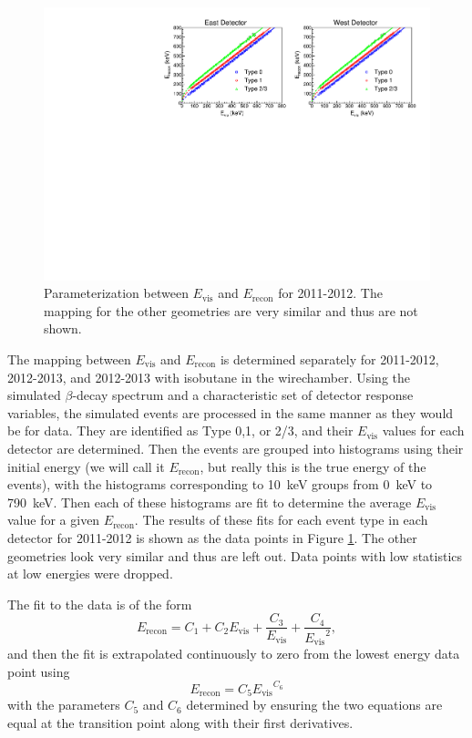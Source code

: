 \begin{figure}[h]
  \centering
  \includegraphics[scale=0.78]{3-UCNAAnalysis/2011-2012_Evis_to_Erecon.pdf}
  \caption{Parameterization between $E_{\mathrm{vis}}$ and $E_{\mathrm{recon}}$ for
    2011-2012. The mapping for the other geometries are very similar and thus are
    not shown.}
  \label{fig:Erecon}
\end{figure}

The mapping between $E_{\mathrm{vis}}$ and $E_{\mathrm{recon}}$ is determined separately
for 2011-2012, 2012-2013, and 2012-2013 with isobutane in the wirechamber.
Using the simulated $\beta$-decay spectrum and a characteristic set of detector
response variables, the simulated events are processed in the same manner as
they would be for data. They are identified as Type 0,1, or 2/3, and their
$E_{\mathrm{vis}}$ values for each detector are determined. Then the events are
grouped into histograms using their initial energy (we will call it $E_{\mathrm{recon}}$,
but really this is the true energy of the events), with the histograms corresponding
to 10~keV groups from 0~keV to 790~keV. Then each of these histograms are fit to
determine the average $E_{\mathrm{vis}}$ value for a given $E_{\mathrm{recon}}$. The results
of these fits for each event type in each detector for 2011-2012 is shown as the data
points in Figure \ref{fig:Erecon}. The other geometries look very similar and thus are
left out. Data points with low statistics at low energies were dropped.

The fit to the data is of the form
\begin{equation}
  E_{\mathrm{recon}} = C_1 + C_2E_{\mathrm{vis}} + \frac{C_3}{E_{\mathrm{vis}}} + \frac{C_4}{{E_{\mathrm{vis}}}^2},
\end{equation}
and then the fit is extrapolated continuously to zero from the lowest energy data point using
\begin{equation}
  E_{\mathrm{recon}} = C_5{E_{\mathrm{vis}}}^{C_6}
\end{equation}
with the parameters $C_5$ and $C_6$ determined by ensuring the two equations are equal at the
transition point along with their first derivatives.

